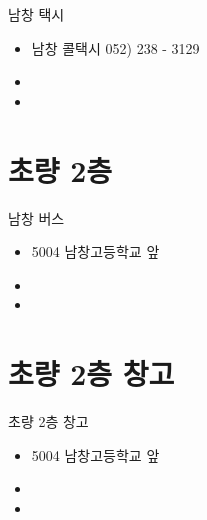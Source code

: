 \documentclass[aspectratio=1610,17pt,xcolor=pdftex,dvipsnames,table,handout]{beamer}
\begin{document}
		\begin{frame} [t,plain]
			\begin{block} {남창 택시  }
			\begin{itemize}
				\item 남창 콜택시 052) 238 - 3129 
  				\item  
				\item  
			\end{itemize}
			\end{block}
		\end{frame}

		

		\section{ 초량 2층}
		\frame [plain] {\sectionpage}

		\begin{frame} [t,plain]
			\begin{block} {남창 버스 }
			\begin{itemize}
				\item 5004 남창고등학교 앞 
  				\item  
				\item  
			\end{itemize}
			\end{block}
		\end{frame}


		\section{ 초량 2층 창고 }
		\frame [plain] {\sectionpage}

		\begin{frame} [t,plain]
			\begin{block} { 초량 2층 창고 }
			\begin{itemize}
				\item 5004 남창고등학교 앞 
  				\item  
				\item  
			\end{itemize}
			\end{block}
		\end{frame}
\end{document}
